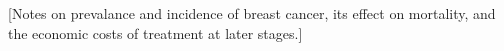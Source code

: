 [Notes on prevalance and incidence of breast cancer, its effect on mortality, and the economic costs of treatment at later stages.]